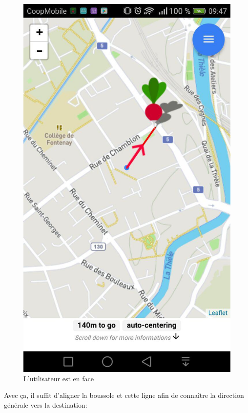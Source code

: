 \documentclass[french]{article}
\begin{document}
\begin{figure}[H]
\begin{minipage}[c]{.46\linewidth}
		\end{minipage} \hfill
		\begin{minipage}[c]{.46\linewidth}
			\centering
			\includegraphics[scale=0.40]{../images/boussole-droite}
			\caption{L'utilisateur est en face}
			\label{}
		\end{minipage}
	\end{figure}
	
	Avec ça, il suffit d'aligner la boussole et cette ligne afin de connaître la direction générale vers la destination:
	
\end{document}
